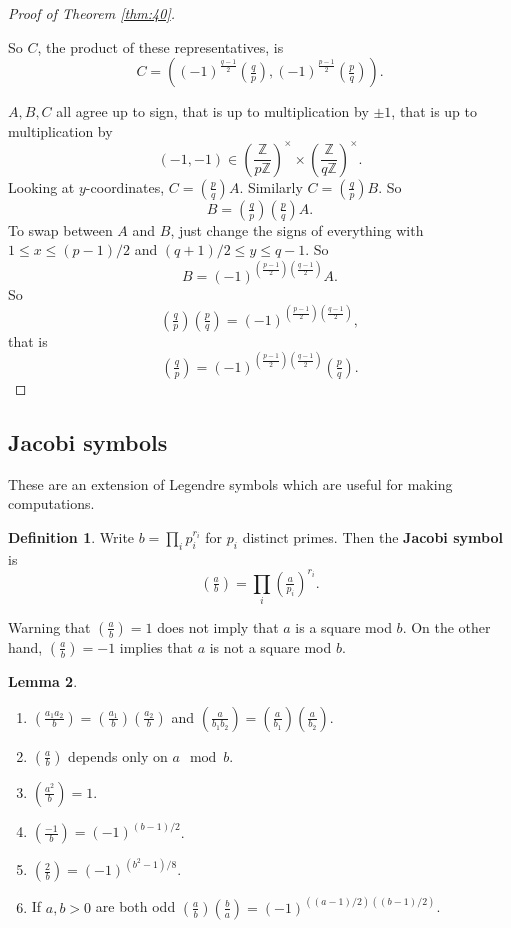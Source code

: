 \documentclass{article}
\newcommand{\Z}{\mathbb{Z}}
\newcommand{\rb}[1]{\left( #1 \right)}
\newcommand{\Unit}[1]{\rb{\dfrac{\Z}{#1\Z}}^\times}
\newcommand{\legendre}[2]{\rb{\tfrac{#1}{#2}}}
\theoremstyle{definition}\newtheorem{definition}{Definition}
\theoremstyle{definition}\newtheorem{remark}[definition]{Remark}
\theoremstyle{definition}\newtheorem*{example}{Example}
\theoremstyle{definition}\newtheorem*{note}{Note}
\newtheorem{lemma}[definition]{Lemma}
\begin{document}
\begin{proof}[Proof of Theorem \ref{thm:40}]
\begin{itemize}
So $ C $, the product of these representatives, is
$$ C = \rb{\rb{-1}^{\tfrac{q - 1}{2}}\legendre{q}{p}, \rb{-1}^{\tfrac{p - 1}{2}}\legendre{p}{q}}. $$
\end{itemize}
$ A, B, C $ all agree up to sign, that is up to multiplication by $ \pm 1 $, that is up to multiplication by
$$ \rb{-1, -1} \in \Unit{p} \times \Unit{q}. $$
Looking at $ y $-coordinates, $ C = \legendre{p}{q}A $. Similarly $ C = \legendre{q}{p}B $. So
$$ B = \legendre{q}{p}\legendre{p}{q}A. $$
To swap between $ A $ and $ B $, just change the signs of everything with $ 1 \le x \le \rb{p - 1} / 2 $ and $ \rb{q + 1} / 2 \le y \le q - 1 $. So
$$ B = \rb{-1}^{\rb{\tfrac{p - 1}{2}}\rb{\tfrac{q - 1}{2}}}A. $$
So
$$ \legendre{q}{p}\legendre{p}{q} = \rb{-1}^{\rb{\tfrac{p - 1}{2}}\rb{\tfrac{q - 1}{2}}}, $$
that is
$$ \legendre{q}{p} = \rb{-1}^{\rb{\tfrac{p - 1}{2}}\rb{\tfrac{q - 1}{2}}}\legendre{p}{q}. $$
\end{proof}

\subsection{Jacobi symbols}

These are an extension of Legendre symbols which are useful for making computations.

\begin{definition}
Write $ b = \prod_i p_i^{r_i} $ for $ p_i $ distinct primes. Then the \textbf{Jacobi symbol} is
$$ \legendre{a}{b} = \prod_i \legendre{a}{p_i}^{r_i}. $$
\end{definition}

Warning that $ \legendre{a}{b} = 1 $ does not imply that $ a $ is a square mod $ b $. On the other hand, $ \legendre{a}{b} = -1 $ implies that $ a $ is not a square mod $ b $.


\begin{lemma}
\hfill
\begin{enumerate}
\item $ \legendre{a_1a_2}{b} = \legendre{a_1}{b}\legendre{a_2}{b} $ and $ \legendre{a}{b_1b_2} = \legendre{a}{b_1}\legendre{a}{b_2} $.
\item $ \legendre{a}{b} $ depends only on $ a \mod b $.
\item $ \legendre{a^2}{b} = 1 $.
\item $ \legendre{-1}{b} = \rb{-1}^{\rb{b - 1} / 2} $.
\item $ \legendre{2}{b} = \rb{-1}^{\rb{b^2 - 1} / 8} $.
\item If $ a, b > 0 $ are both odd $ \legendre{a}{b}\legendre{b}{a} = \rb{-1}^{\rb{\rb{a - 1} / 2}\rb{\rb{b - 1} / 2}} $.
\end{enumerate}
\end{lemma}
\end{document}

